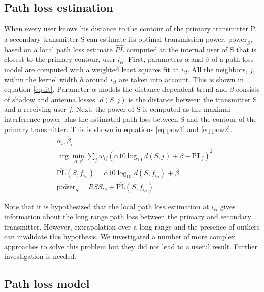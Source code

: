 \subsection{Path loss estimation} \label{sec:pathloss est}

When every user knows his distance to the contour of the primary transmitter P, a secondary transmitter S can estimate its optimal transmission power, $\hat{\textrm{power}}_S$, based on a local path loss estimate $\hat{PL}$ computed at the internal user of S that is closest to the primary contour, user $i_{cl}$. First, parameters $\alpha$ and $\beta$ of a path loss model are computed with a weighted least squares fit at $i_{cl}$. All the neighbors, $j$, within the kernel width $h$ around $i_{cl}$ are taken into account. This is shown in equation \ref{eq:fit}. Parameter $\alpha$ models the distance-dependent trend and $\beta$ consists of shadow and antenna losses. $d(S,j)$ is the distance between the transmitter S and a receiving user $j$. Next, the power of S is computed as the maximal interference power plus the estimated path loss between S and the contour of the primary transmitter. This is shown in equations \ref{eq:pow1} and \ref{eq:pow2}.
\begin{align}
&\hat{\alpha}_i,\hat{\beta}_i = \label{eq:fit} \\ \nonumber 
&\arg\min_{\alpha,\beta}\sum_j w_{ij}(\alpha10\log_{10} d(S,j)+\beta-\textrm{PL}_j)^2 \\
&\hat{\textrm{PL}}(S,f_{i_{cl}})=\hat{\alpha}10\log_{10}d(S,f_{i_{cl}})+\hat{\beta} \label{eq:pow1} \\
&\hat{\textrm{power}}_S=RSS_{th}+\hat{\textrm{PL}}(S,f_{i_{cl}}) \label{eq:pow2}
\end{align}

Note that it is hypothesized that the local path loss estimation at $i_{cl}$ gives information about the long range path loss between the primary and secondary transmitter. However, extrapolation over a long range and the presence of outliers can invalidate this hypothesis. We investigated a number of more complex approaches to solve this problem but they did not lead to a useful result. Further investigation is needed.

\subsection{Path loss model}

